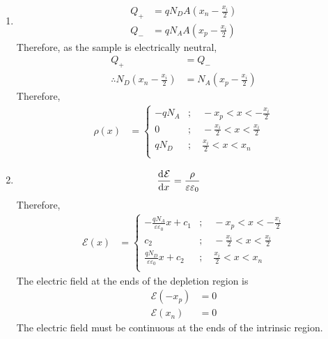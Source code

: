 \documentclass[titlepage, fleqn, a4paper, 12pt, twoside]{article}
\theoremstyle{definition}
\theoremstyle{theorem}
\begin{document}
\begin{solution}
	\begin{enumerate}[leftmargin=*]
		\item
			\begin{align*}
				Q_+ & = q N_D A \left( x_n - \frac{x_i}{2} \right) \\
				Q_- & = q N_A A \left( x_p - \frac{x_i}{2} \right)
			\end{align*}
			Therefore, as the sample is electrically neutral,
			\begin{align*}
				Q_+                                               & = Q_- \\
				\therefore N_D \left( x_n - \frac{x_i}{2} \right) & = N_A \left( x_p - \frac{x_i}{2} \right)
			\end{align*}
			Therefore,
			\begin{align*}
				\rho(x) &=
					\begin{cases}
						-q N_A & ;\quad -x_p < x < -\frac{x_i}{2}          \\
						0      & ;\quad -\frac{x_i}{2} < x < \frac{x_i}{2} \\
						q N_D  & ;\quad \frac{x_i}{2} < x < x_n            \\
					\end{cases}
			\end{align*}
		\item
			\begin{align*}
				\dod{\mathcal{E}}{x} & = \frac{\rho}{\varepsilon \varepsilon_0}
			\end{align*}
			Therefore,
			\begin{align*}
				\mathcal{E}(x) &=
					\begin{cases}
						-\frac{q N_A}{\varepsilon \varepsilon_0} x + c_1 & ;\quad -x_p < x < -\frac{x_i}{2}          \\
						c_2                                              & ;\quad -\frac{x_i}{2} < x < \frac{x_i}{2} \\
						\frac{q N_D}{\varepsilon \varepsilon_0} x + c_2  & ;\quad \frac{x_i}{2} < x < x_n            \\
					\end{cases}
			\end{align*}
			The electric field at the ends of the depletion region is
			\begin{align*}
				\mathcal{E}(-x_p) & = 0 \\
				\mathcal{E}(x_n)  & = 0
			\end{align*}
			The electric field must be continuous at the ends of the intrinsic region.

\end{enumerate}
\end{solution}
\end{document}
